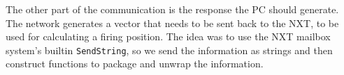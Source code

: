 The other part of the communication is the response the PC should generate. The
network generates a vector that needs to be sent back to the NXT, to be used for
calculating a firing position. The idea was to use the NXT mailbox system's
builtin \texttt{SendString}, so we send the information as strings and then
construct functions to package and unwrap the information.


